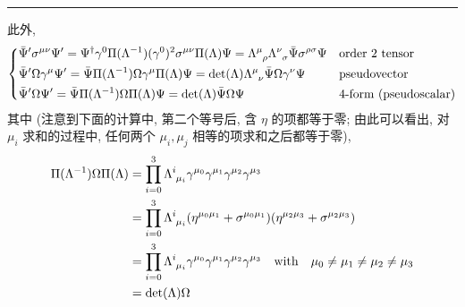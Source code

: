 \begin{itemize}
\begin{tcolorbox}[title=calculation:]
		\noindent\rule[0.5ex]{\linewidth}{0.5pt} %
		
		此外,
		\begin{equation} \label{6.2.21}
			\begin{dcases}
				\bar{\Psi}' \sigma^{\mu \nu} \Psi' = \Psi^\dag \gamma^0 \Pi(\Lambda^{- 1}) (\gamma^0)^2 \sigma^{\mu \nu} \Pi(\Lambda) \Psi = \tensor{\Lambda}{^\mu_\rho} \tensor{\Lambda}{^\nu_\sigma} \bar{\Psi} \sigma^{\rho \sigma} \Psi & \text{order 2 tensor} \\
				\bar{\Psi}' \Omega \gamma^\mu \Psi' = \bar{\Psi} \Pi(\Lambda^{- 1}) \Omega \gamma^\mu \Pi(\Lambda) \Psi = \det(\Lambda) \tensor{\Lambda}{^\mu_\nu} \bar{\Psi} \Omega \gamma^\nu \Psi & \text{pseudovector} \\
				\bar{\Psi}' \Omega \Psi' = \bar{\Psi} \Pi(\Lambda^{- 1}) \Omega \Pi(\Lambda) \Psi = \det(\Lambda) \bar{\Psi} \Omega \Psi & \text{4-form (pseudoscalar)}
			\end{dcases}
		\end{equation}
		其中 (注意到下面的计算中, 第二个等号后, 含 $\eta$ 的项都等于零; 由此可以看出, 对 $\mu_i$ 求和的过程中, 任何两个 $\mu_i, \mu_j$ 相等的项求和之后都等于零),
		\begin{align}
			\Pi(\Lambda^{- 1}) \Omega \Pi(\Lambda) &= \prod_{i = 0}^3 \tensor{\Lambda}{^i_{\mu_i}} \gamma^{\mu_0} \gamma^{\mu_1} \gamma^{\mu_2} \gamma^{\mu_3} \notag \\
			&= \prod_{i = 0}^3 \tensor{\Lambda}{^i_{\mu_i}} (\eta^{\mu_0 \mu_1} + \sigma^{\mu_0 \mu_1}) (\eta^{\mu_2 \mu_3} + \sigma^{\mu_2 \mu_3}) \notag \\
			&= \prod_{i = 0}^3 \tensor{\Lambda}{^i_{\mu_i}} \gamma^{\mu_0} \gamma^{\mu_1} \gamma^{\mu_2} \gamma^{\mu_3} \quad \text{with} \quad \mu_0 \neq \mu_1 \neq \mu_2 \neq \mu_3 \notag \\
			&= \det(\Lambda) \Omega
		\end{align}
	\end{tcolorbox}
\end{itemize}

